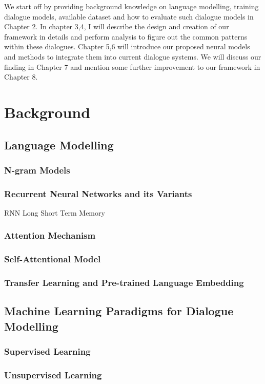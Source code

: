 \documentclass[bsc,frontabs,twoside,singlespacing,parskip,deptreport]{infthesis}     %
\begin{document}
We start off by providing background knowledge on language modelling, training dialogue models, available dataset and how to evaluate such dialogue models in Chapter 2. In chapter 3,4, I will describe the design and creation of our framework in details and perform analysis to figure out the common patterns within these dialogues. Chapter 5,6 will introduce our proposed neural models and methods to integrate them into current dialogue systems. We will discuss our finding in Chapter 7 and mention some further improvement to our framework in Chapter 8.

\chapter{Background}

\section{Language Modelling}
\subsection{N-gram Models}

\subsection{Recurrent Neural Networks and its Variants}
RNN
Long Short Term Memory
\subsection{Attention Mechanism}
\subsection{Self-Attentional Model}
\subsection{Transfer Learning and Pre-trained Language Embedding}


\section{Machine Learning Paradigms for Dialogue Modelling}
\subsection{Supervised Learning}
\subsection{Unsupervised Learning}
\end{document}
